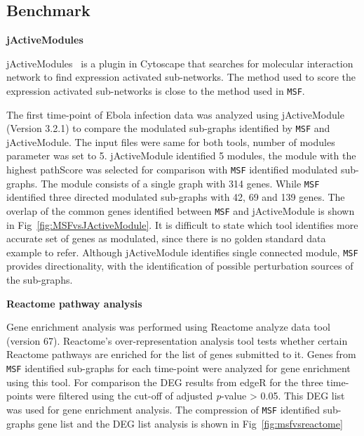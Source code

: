 \documentclass[10pt,a4paper,twocolumn]{article}
\begin{document}
	\subsection*{Benchmark}
	
	
	\textbf{jActiveModules}
	
	jActiveModules~\cite{jActiveModules} is a plugin in Cytoscape that searches for molecular interaction network to find expression activated sub-networks. The method used to score the expression activated sub-networks is close to the method used in \texttt{MSF}.
	
	The first time-point of Ebola infection data was analyzed using jActiveModule (Version 3.2.1) to compare the modulated sub-graphs identified by \texttt{MSF} and jActiveModule. The input files were same for both tools, number of modules parameter was set to 5. jActiveModule identified 5 modules, the module with the highest pathScore was selected for comparison with \texttt{MSF} identified modulated sub-graphs. The module consists of a single graph with 314 genes. While \texttt{MSF} identified three directed modulated sub-graphs with 42, 69 and 139 genes. The overlap of the common genes identified between \texttt{MSF} and jActiveModule is shown in Fig~\ref{fig:MSFvsJActiveModule}. It is difficult to state which tool identifies more accurate set of genes as modulated, since there is no golden standard data example to refer. Although jActiveModule identifies single connected module, \texttt{MSF} provides directionality, with the identification of possible perturbation sources of the sub-graphs.
	
	\textbf{Reactome pathway analysis}
	
	Gene enrichment analysis was performed using Reactome analyze data
	tool~\cite{Reactome} (version 67). Reactome's over-representation analysis tool tests whether
	certain Reactome pathways are enriched for the list of genes submitted to it. Genes from \texttt{MSF} identified
	sub-graphs for each time-point were analyzed for gene enrichment using this tool.  For
	comparison the DEG results from edgeR for the three time-points were filtered using the cut-off of
	adjusted \textit{p}-value > 0.05. This DEG list was used for gene
	enrichment analysis. The compression of \texttt{MSF} identified sub-graphs gene list and the DEG list analysis is shown in Fig~\ref{fig:msfvsreactome}
	
\end{document}
